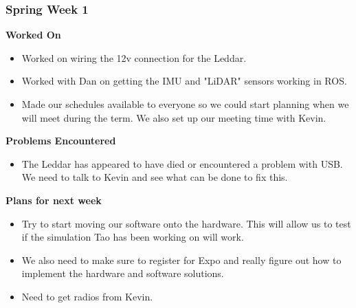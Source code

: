 \documentclass[compsoc,draftclsnofoot,onecolumn,10pt]{IEEEtran}
\begin{document}
\subsubsection*{Spring Week 1}
\textbf{Worked On}
\begin{itemize}
    \item Worked on wiring the 12v connection for the Leddar.
    \item Worked with Dan on getting the IMU and "LiDAR" sensors working in ROS.
    \item Made our schedules available to everyone so we could start planning when we will meet during the term. We also set up our meeting time with Kevin.
\end{itemize}
\textbf{Problems Encountered}
\begin{itemize}
    \item The Leddar has appeared to have died or encountered a problem with USB. We need to talk to Kevin and see what can be done to fix this.
\end{itemize}
\textbf{Plans for next week}
\begin{itemize}
    \item Try to start moving our software onto the hardware. This will allow us to test if the simulation Tao has been working on will work.
    \item We also need to make sure to register for Expo and really figure out how to implement the hardware and software solutions.
    \item Need to get radios from Kevin.
\end{itemize}
\end{document}
